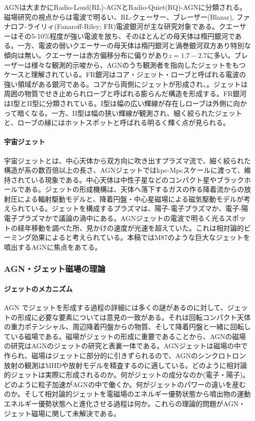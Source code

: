 AGNは大まかにRadio-Loud(RL)-AGNとRadio-Quiet(RQ)-AGNに分類される。磁場研究の視点からは電波で明るい、RL-クェーサー、ブレーザー(Blazar), ファナロフ-ライリィ(Fanaroff-Riley; FR)電波銀河が主な研究対象である。クエーサーはその5-10\%程度が強い電波を放ち、そのほとんどの母天体は楕円銀河である。一方、電波の弱いクエーサーの母天体は楕円銀河と渦巻銀河双方あり特別な傾向は無い。クエーサーは赤方偏移分布に偏りがあり$z=1.7-2.7$に多い。ブレーザーは様々な観測的示唆から、AGNのうち観測者を指向したジェットをもつケースと理解されている。FR銀河はコア・ジェット・ローブと呼ばれる電波の強い領域がある銀河である。コアから両側にジェットが形成され、。ジェットは周囲の物質でせき止められローブと呼ばれる膨らんだ構造を形成する。FR銀河はI型とII型に分類されている。I型は幅の広い輝線が存在しローブは外側に向かって暗くなる。一方、II型は幅の狭い輝線が観測され、細く絞られたジェットと、ローブの縁にはホットスポットと呼ばれる明るく輝く点が見られる。

\paragraph{宇宙ジェット}

宇宙ジェットとは、中心天体から双方向に吹き出すプラズマ流で、細く絞られた構造が系の数百倍以上の長さ、AGNジェットではkpc-Mpcスケールに渡って、維持されている現象である。中心天体は中性子星などのコンパクト星やブラックホールである。ジェットの形成機構は、天体へ落下するガスの作る降着流からの放射圧による輻射駆動モデルと、降着円盤・中心星磁場による磁気駆動モデルが考えられている。ジェットを構成するプラズマは、陽子-電子プラズマか、電子-陽電子プラズマかで議論の渦中にある。AGNジェットの電波で明るく光るスポットの経年移動を調べた所、見かけの速度が光速を超えていた。これは相対論的ビーミング効果によると考えられている。本稿ではM87のような巨大なジェットを噴出するAGNに焦点をあてる。

\subsubsection{AGN・ジェット磁場の理論}
\label{c06.s1.ss4.sss2}

\paragraph{ジェットのメカニズム}

AGN でジェットを形成する過程の詳細には多くの謎があるのに対して、ジェットの形成に必要な要素については意見の一致がある。それは回転コンパクト天体の重力ポテンシャル、周辺降着円盤からの物質、そして降着円盤と一緒に回転している磁場である。磁場がジェットの形成に重要であることから、AGNの磁場の研究はAGNのジェットの研究と表裏一体である。AGNジェットは磁場の中で作られ、磁場はジェットに部分的に引きずられるので、AGNのシンクロトロン放射の観測はMHDや放射モデルを精査するのに適している。どのように相対論的ジェットは実際に形成されるのか。何がジェットの成分なのか(電子・陽子)。どのように粒子加速がAGNの中で働くか。何がジェットのパワーの違いを産むのか。そして相対論的ジェットを電磁場のエネルギー優勢状態から噴出物の運動エネルギー優勢状態へと進化させる過程は何か。これらの理論的問題がAGN・ジェット磁場に関して未解決である。

